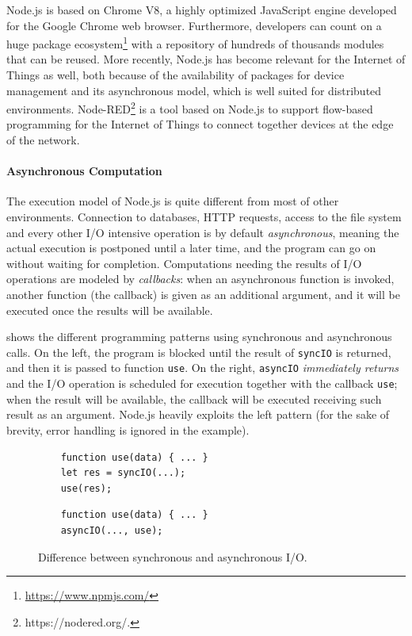 Node.js is based on Chrome V8, a highly optimized JavaScript engine developed for the Google Chrome web browser. 
Furthermore, developers can count on a huge package ecosystem\footnote{\url{https://www.npmjs.com/}} with a repository of hundreds of thousands modules that can be reused.
More recently, Node.js has become relevant for the Internet of Things as well, both because of the availability of packages for device management and its asynchronous model, which is well suited for distributed environments.
Node-RED\footnote{https://nodered.org/.} is a tool based on Node.js to support flow-based programming for the Internet of Things to
connect together devices at the edge of the network.

\paragraph{Asynchronous Computation}
The execution model of Node.js is quite different from most of other environments.
Connection to databases, HTTP requests, access to the file system and every other I/O intensive operation is by default \emph{asynchronous}, meaning the actual execution is postponed until a later time, and the program can go on without waiting for completion.
Computations needing the results of I/O operations are modeled by \emph{callbacks}: when an asynchronous function is invoked, another function (the callback) is given as an additional argument, and it will be executed once the results will be available.

 shows the different programming patterns using synchronous and asynchronous calls.
On the left, the program is blocked until the result of \lstinline{syncIO} is returned, and then it is passed to function \lstinline{use}.
On the right, \lstinline{asyncIO} \emph{immediately returns} and the I/O operation is scheduled for execution together with the callback \lstinline{use}; when the result will be available, the callback will be executed receiving such result as an argument.
Node.js heavily exploits the left pattern (for the sake of brevity, error handling is ignored in the example).

\begin{figure}[h]
\begin{minipage}{.5\textwidth}
\begin{lstlisting}
	function use(data) { ... }
	let res = syncIO(...);
	use(res);
\end{lstlisting}
\end{minipage}
\begin{minipage}{.5\textwidth}
	\begin{lstlisting}
	function use(data) { ... }
	asyncIO(..., use);
	\end{lstlisting}
\end{minipage}
\caption{Difference between synchronous and asynchronous I/O.}
\label{lst:async}
\end{figure}

